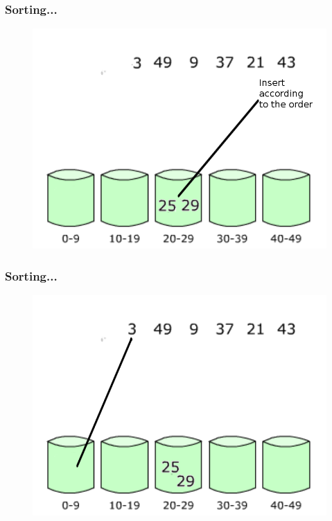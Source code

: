 \documentclass[pdf]{beamer}
\begin{document}
\begin{frame}
	\frametitle{Sorting...}
	\begin{figure}
		\includegraphics[scale=.3]{Figure/4-i.png}
	\end{figure}	
\end{frame}

\begin{frame}
	\frametitle{Sorting...}
	\begin{figure}
		\includegraphics[scale=.3]{Figure/5.png}
	\end{figure}	
\end{frame}
\end{document}
